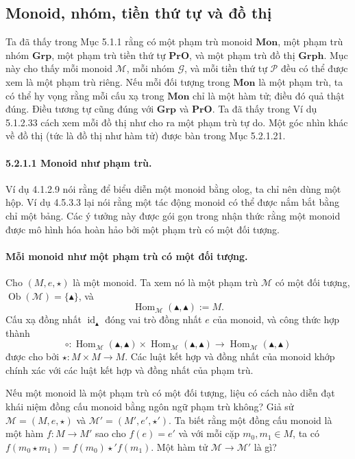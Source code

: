 \subsection{Monoid, nhóm, tiền thứ tự và đồ thị}
Ta đã thấy trong Mục 5.1.1 rằng có một phạm trù monoid $\mathbf{Mon}$, một phạm trù nhóm $\mathbf{Grp}$, một phạm trù tiền thứ tự $\mathbf{PrO}$, và một phạm trù đồ thị $\mathbf{Grph}$. Mục này cho thấy mỗi monoid $\mathcal M$, mỗi nhóm $\mathcal G$, và mỗi tiền thứ tự $\mathcal P$ đều có thể được xem là một phạm trù riêng. Nếu mỗi đối tượng trong $\mathbf{Mon}$ là một phạm trù, ta có thể hy vọng rằng mỗi cấu xạ trong $\mathbf{Mon}$ chỉ là một hàm tử; điều đó quả thật đúng. Điều tương tự cũng đúng với $\mathbf{Grp}$ và $\mathbf{PrO}$. Ta đã thấy trong Ví dụ 5.1.2.33 cách xem mỗi đồ thị như cho ra một phạm trù tự do. Một góc nhìn khác về đồ thị (tức là đồ thị như hàm tử) được bàn trong Mục 5.2.1.21.
\paragraph{5.2.1.1 Monoid như phạm trù.} Ví dụ 4.1.2.9 nói rằng để biểu diễn một monoid bằng olog, ta chỉ nên dùng một hộp. Ví dụ 4.5.3.3 lại nói rằng một tác động monoid có thể được nắm bắt bằng chỉ một bảng. Các ý tưởng này được gói gọn trong nhận thức rằng một monoid được mô hình hóa hoàn hảo bởi một phạm trù có một đối tượng.
\paragraph{Mỗi monoid như một phạm trù có một đối tượng.} Cho $(M,e,\star)$ là một monoid. Ta xem nó là một phạm trù $\mathcal M$ có một đối tượng, $\operatorname{Ob}(\mathcal M)=\{\blacktriangle\}$, và
\[\operatorname{Hom}_{\mathcal M}(\blacktriangle,\blacktriangle):=M.\]
Cấu xạ đồng nhất $\operatorname{id}_{\blacktriangle}$ đóng vai trò đồng nhất $e$ của monoid, và công thức hợp thành
\[\circ:\operatorname{Hom}_{\mathcal M}(\blacktriangle,\blacktriangle)\times\operatorname{Hom}_{\mathcal M}(\blacktriangle,\blacktriangle)\longrightarrow\operatorname{Hom}_{\mathcal M}(\blacktriangle,\blacktriangle)\]
được cho bởi $\star:M\times M\to M$. Các luật kết hợp và đồng nhất của monoid khớp chính xác với các luật kết hợp và đồng nhất của phạm trù.

Nếu một monoid là một phạm trù có một đối tượng, liệu có cách nào diễn đạt khái niệm đồng cấu monoid bằng ngôn ngữ phạm trù không? Giả sử $\mathcal M=(M,e,\star)$ và $\mathcal M'=(M',e',\star')$. Ta biết rằng một đồng cấu monoid là một hàm $f:M\to M'$ sao cho $f(e)=e'$ và với mỗi cặp $m_0,m_1\in M$, ta có $f(m_0\star m_1)=f(m_0)\star' f(m_1)$. Một hàm tử $\mathcal M\to\mathcal M'$ là gì?
